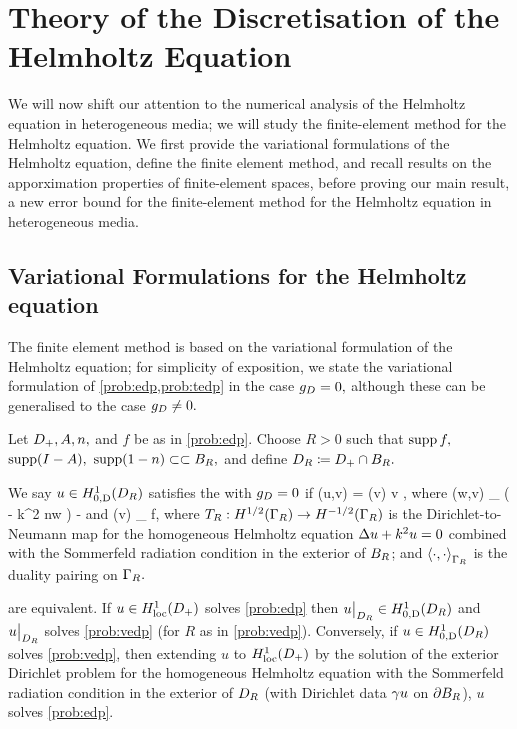 \section{Theory of the Discretisation of the Helmholtz Equation}\label{sec:helmfe}

We will now shift our attention to the numerical analysis of the Helmholtz equation in heterogeneous media; we will study the finite-element method for the Helmholtz equation. We first provide the variational formulations of the Helmholtz equation, define the finite element method, and recall results on the apporximation properties of finite-element spaces, before proving our main result, a new error bound for the finite-element method for the Helmholtz equation in heterogeneous media.

  \subsection{Variational Formulations for the Helmholtz equation}\label{sec:varform}
  The finite element method is based on the variational formulation of the Helmholtz equation; for simplicity of exposition, we state the variational formulation of \cref{prob:edp,prob:tedp} in the case $g_{D} = 0,$ although these can be generalised to the case $g_{D} \neq 0.$
  
\bprob[Variational formulation of EDP when $\gD = 0$]\label{prob:vedp}
Let $D_{+}, A, n,$ and $f$ be as in \cref{prob:edp}. Choose $R>0$ such that $\operatorname{supp} f,$ $\operatorname{supp}(I-A),$ $\operatorname{supp}(1-n) \subset\subset B_{R},$ and define $D_{R} \coloneqq D_{+} \cap B_{R}.$

We say $u \in \HozDDR$ satisfies the  with $\gD = 0$ if
\beqs
\aE(u,v) = \FE(v) \tfa v \in \HozDDR,
\eeqs
where
\beqs
\aE(w,v) \de \int_{\DR} \mleft( - k^2 n\minispace w \vbar\mright) - 
\eeqs
and
\beqs
\FE(v) \de \int_{\DR} f\minispace\vbar,
\eeqs
where $\DtN:\HhGR\rightarrow \HmhGR$ is the Dirichlet-to-Neumann map for the homogeneous Helmholtz equation $\Delta u + k^2 u = 0$ combined with the Sommerfeld radiation condition in the exterior of $B_{R}$; and $\DPGR{\cdot}{\cdot}$ is the duality pairing on $\Gamma_{R}.$
\eprob

\label{lem:edpform}
 are equivalent. If $u \in \HolocDp$ solves \cref{prob:edp} then $u\restrict_{\DR} \in \HozDDR$ and $u\big|_{D_{R}}$ solves \cref{prob:vedp}  (for $R$ as in \cref{prob:vedp}). Conversely, if $u \in \HozDDR$ solves \cref{prob:vedp}, then extending $u$ to $\HolocDp$ by the solution of the exterior Dirichlet problem for the homogeneous Helmholtz equation with the Sommerfeld radiation condition in the exterior of $D_{R}$ (with Dirichlet data $\gamma u$ on $\partial B_{R}$), $u$ solves \cref{prob:edp}.
\ele

